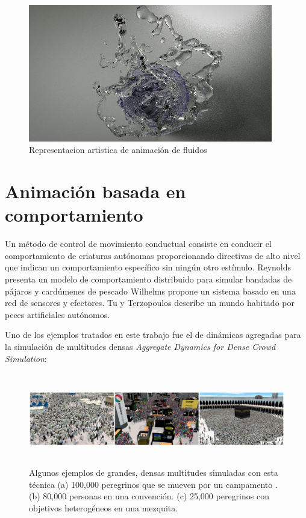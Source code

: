 \documentclass[a4paper,12pt]{report}
\begin{document}
\begin{figure}[ht]
    \centering
    \includegraphics[height=6cm]{Imagenes/fluid_animation}
    \caption{Representacion artistica de animación de fluidos}
    \label{fig:fluid_animation}
\end{figure}
 
 
\chapter{Animación basada en comportamiento}
 
 
Un método de control de movimiento conductual consiste en conducir el comportamiento de criaturas autónomas
proporcionando directivas de alto nivel que indican un comportamiento específico sin ningún otro estímulo.
Reynolds\cite{reynolds} presenta un modelo de comportamiento distribuido para simular bandadas de pájaros y cardúmenes
de pescado Wilhelms\cite{wilhelms}  propone un sistema basado en una red de sensores y efectores. Tu y
Terzopoulos\cite{terzopoulos} describe un mundo habitado por peces artificiales autónomos.
 
 
Uno de los ejemplos tratados en este trabajo fue el de dinámicas agregadas para la simulación de multitudes densas \textit{Aggregate Dynamics for Dense Crowd Simulation}:
 
 
\begin{figure}[ht]
    \hspace*{-2.5cm}
    \includegraphics[height=4cm]{Imagenes/agregate_fig}
    \caption{Algunos ejemplos de grandes, densas multitudes simuladas con esta técnica (a) 100,000 peregrinos que se mueven por un campamento
    . (b) 80,000 personas en una convención. (c) 25,000 peregrinos con objetivos heterogéneos en una mezquita.}
    \label{fig:agregate_fig}
\end{figure}
 
\end{document}

